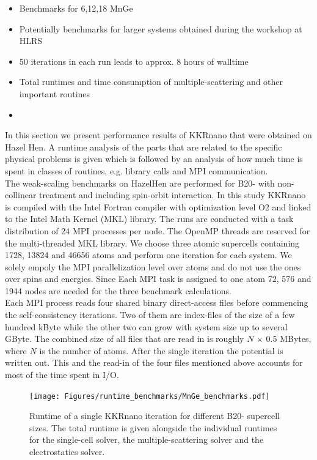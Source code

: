 \documentclass [a4paper, 12pt]{article}
\begin{document}
\begin{itemize}
	\item Benchmarks for 6,12,18 MnGe
	\item Potentially benchmarks for larger systems obtained during the workshop at HLRS
	\item 50 iterations in each run leads to approx. 8 hours of walltime
	\item Total runtimes and time consumption of multiple-scattering and other important routines
\end{itemize}

\begin{itemize}
	\item 
\end{itemize}
In this section we present performance results of KKRnano that were obtained on Hazel Hen.
A runtime analysis of the parts that are related to the specific physical problems is given
which is followed by an analysis of how much time is spent in
classes of routines, e.g. library calls and MPI communication.\\

The weak-scaling benchmarks on HazelHen are performed for B20- with non-collinear
treatment and including spin-orbit interaction.
In this study KKRnano is compiled with the Intel Fortran compiler
with optimization level O2 and linked to the Intel Math Kernel (MKL) library.
The runs are conducted with a task distribution of 24 MPI processes per node. The OpenMP threads 
are reserved for the multi-threaded MKL library.
We choose three atomic supercells containing 1728, 13824 and 46656 atoms 
and perform one iteration for each system.
We solely empoly the MPI parallelization level over atoms and do not use the ones over spins and energies.
Since Each MPI task is assigned to one atom 72, 576 and 1944 nodes
are needed for the three benchmark calculations. 
\\
Each MPI process reads four shared binary direct-access
files before commencing the self-consistency iterations.
Two of them are index-files of the size of a few hundred kByte while the other two can grow with system size
up to several GByte. The combined size of all files that are 
read in is roughly $N$ $\times$ 0.5 MBytes, where $N$ is the number of atoms. After the single iteration 
the potential is written out. 
This and the read-in of the four files mentioned above accounts for most of the time spent in I/O.

\begin{figure}[h]
\begin{center}
 \texttt{[image: Figures/runtime\_benchmarks/MnGe\_benchmarks.pdf]}
\end{center}
	\caption{Runtime of a single KKRnano iteration for different B20- supercell sizes. 
	The total runtime is given alongside the individual runtimes for the single-cell solver,
	the multiple-scattering solver and the electrostatics solver.
	}
\label{fig:MnGe_6x6x6_benchmark}
\end{figure}
\end{document}
